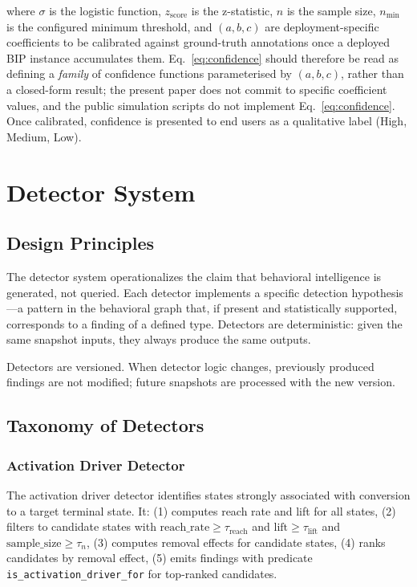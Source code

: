 \documentclass[12pt, a4paper]{article}
\begin{document}
where $\sigma$ is the logistic function, $z_{\text{score}}$ is the z-statistic, $n$ is the sample size, $n_{\min}$ is the configured minimum threshold, and $(a, b, c)$ are deployment-specific coefficients to be calibrated against ground-truth annotations once a deployed BIP instance accumulates them. Eq.~\eqref{eq:confidence} should therefore be read as defining a \emph{family} of confidence functions parameterised by $(a, b, c)$, rather than a closed-form result; the present paper does not commit to specific coefficient values, and the public simulation scripts do not implement Eq.~\eqref{eq:confidence}. Once calibrated, confidence is presented to end users as a qualitative label (High, Medium, Low).

\section{Detector System}
\label{sec:detectors}

\subsection{Design Principles}

The detector system operationalizes the claim that behavioral intelligence is generated, not queried. Each detector implements a specific detection hypothesis---a pattern in the behavioral graph that, if present and statistically supported, corresponds to a finding of a defined type. Detectors are deterministic: given the same snapshot inputs, they always produce the same outputs.

Detectors are versioned. When detector logic changes, previously produced findings are not modified; future snapshots are processed with the new version.

\subsection{Taxonomy of Detectors}

\subsubsection{Activation Driver Detector}

The activation driver detector identifies states strongly associated with conversion to a target terminal state. It: (1) computes reach rate and lift for all states, (2) filters to candidate states with $\text{reach\_rate} \geq \tau_{\text{reach}}$ and $\text{lift} \geq \tau_{\text{lift}}$ and $\text{sample\_size} \geq \tau_n$, (3) computes removal effects for candidate states, (4) ranks candidates by removal effect, (5) emits findings with predicate \texttt{is\_activation\_driver\_for} for top-ranked candidates.
\end{document}
